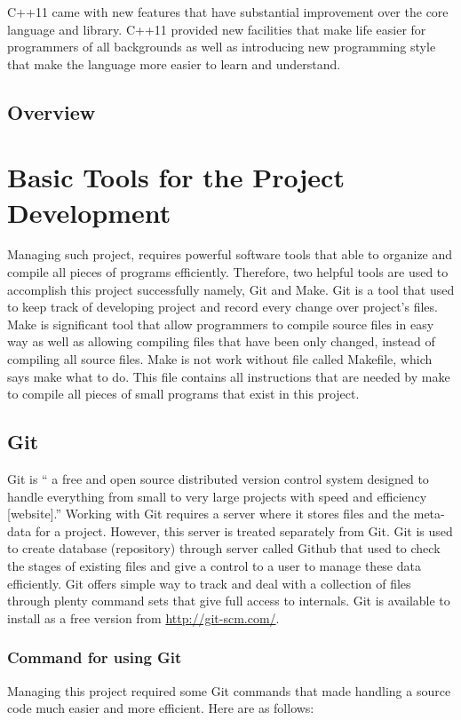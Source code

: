 \documentclass[11pt]{report}
\begin{document}
C++11 came with new features that have substantial improvement over the core language and library. C++11 provided new facilities that make life easier for programmers of all backgrounds as well as introducing new programming style  that make the language more easier to learn and understand.


\section{Overview}
\label{sec: Overview}
 
\chapter{Basic Tools for the Project Development}
\label{cha: tools}
Managing such project, requires powerful software tools that able to organize and compile all pieces of programs efficiently. Therefore, two helpful tools are used to accomplish this project successfully namely, Git and Make. Git is a tool that used to keep track of developing project and record every change over project's files. Make is significant tool that allow programmers to compile source files in easy way as well as allowing compiling files that have been only changed, instead of compiling all source files. Make is not work without file called Makefile, which says make what to do. This file contains all instructions that are needed by make to compile all pieces of small programs that exist in this project.

\section{Git}
\label{sec: Git}
Git is “ a free and open source distributed version control system designed to handle everything from small to very large projects with speed and efficiency [website].”  Working with Git requires a server where it stores files and the meta-data for a project. However, this server is treated separately from Git.  Git is used to create database (repository) through server called Github that used to check the stages of existing files and give a control to a user to manage these data efficiently. Git offers simple way to track and deal with a collection of files through plenty command sets that give full access to internals. Git is available to install as a free version from  \url{http://git-scm.com/}.


\subsection{Command for using Git}
\label{subsec: Command for using Git}
Managing this project required some Git commands that made handling a source code much easier and more efficient. Here are as follows:
\end{document}
